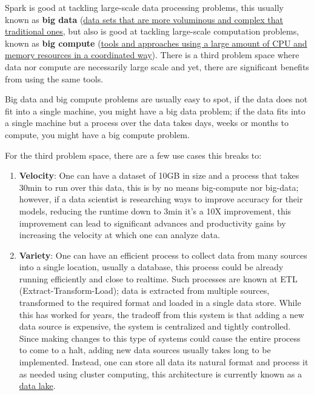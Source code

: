 \documentclass[]{book}
\theoremstyle{definition}
\theoremstyle{definition}
\theoremstyle{definition}
\theoremstyle{remark}
\begin{document}
Spark is good at tackling large-scale data processing problems, this
usually known as \textbf{big data}
(\href{https://en.wikipedia.org/wiki/big_data}{data sets that are more
voluminous and complex that traditional ones}, but also is good at
tackling large-scale computation problems, known as \textbf{big compute}
(\href{https://www.nimbix.net/glossary/big-compute/}{tools and
approaches using a large amount of CPU and memory resources in a
coordinated way}). There is a third problem space where data nor compute
are necessarily large scale and yet, there are significant benefits from
using the same tools.

Big data and big compute problems are usually easy to spot, if the data
does not fit into a single machine, you might have a big data problem;
if the data fits into a single machine but a process over the data takes
days, weeks or months to compute, you might have a big compute problem.

For the third problem space, there are a few use cases this breaks to:

\begin{enumerate}
\def\labelenumi{\arabic{enumi}.}
\item
  \textbf{Velocity}: One can have a dataset of 10GB in size and a
  process that takes 30min to run over this data, this is by no means
  big-compute nor big-data; however, if a data scientist is researching
  ways to improve accuracy for their models, reducing the runtime down
  to 3min it's a 10X improvement, this improvement can lead to
  significant advances and productivity gains by increasing the velocity
  at which one can analyze data.
\item
  \textbf{Variety}: One can have an efficient process to collect data
  from many sources into a single location, usually a database, this
  process could be already running efficiently and close to realtime.
  Such processes are known at ETL (Extract-Transform-Load); data is
  extracted from multiple sources, transformed to the required format
  and loaded in a single data store. While this has worked for years,
  the tradeoff from this system is that adding a new data source is
  expensive, the system is centralized and tightly controlled. Since
  making changes to this type of systems could cause the entire process
  to come to a halt, adding new data sources usually takes long to be
  implemented. Instead, one can store all data its natural format and
  process it as needed using cluster computing, this architecture is
  currently known as a
  \href{https://en.wikipedia.org/wiki/Data_lake}{data lake}.
\end{enumerate}
\end{document}
